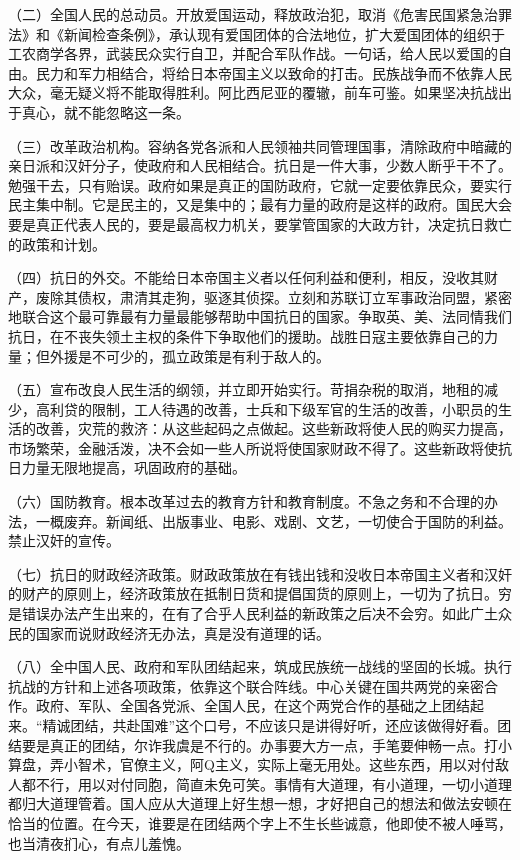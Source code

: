 （二）全国人民的总动员。开放爱国运动，释放政治犯，取消《危害民国紧急治罪法》和《新闻检查条例》，承认现有爱国团体的合法地位，扩大爱国团体的组织于工农商学各界，武装民众实行自卫，并配合军队作战。一句话，给人民以爱国的自由。民力和军力相结合，将给日本帝国主义以致命的打击。民族战争而不依靠人民大众，毫无疑义将不能取得胜利。阿比西尼亚的覆辙，前车可鉴。如果坚决抗战出于真心，就不能忽略这一条。

（三）改革政治机构。容纳各党各派和人民领袖共同管理国事，清除政府中暗藏的亲日派和汉奸分子，使政府和人民相结合。抗日是一件大事，少数人断乎干不了。勉强干去，只有贻误。政府如果是真正的国防政府，它就一定要依靠民众，要实行民主集中制。它是民主的，又是集中的；最有力量的政府是这样的政府。国民大会要是真正代表人民的，要是最高权力机关，要掌管国家的大政方针，决定抗日救亡的政策和计划。

（四）抗日的外交。不能给日本帝国主义者以任何利益和便利，相反，没收其财产，废除其债权，肃清其走狗，驱逐其侦探。立刻和苏联订立军事政治同盟，紧密地联合这个最可靠最有力量最能够帮助中国抗日的国家。争取英、美、法同情我们抗日，在不丧失领土主权的条件下争取他们的援助。战胜日寇主要依靠自己的力量；但外援是不可少的，孤立政策是有利于敌人的。

（五）宣布改良人民生活的纲领，并立即开始实行。苛捐杂税的取消，地租的减少，高利贷的限制，工人待遇的改善，士兵和下级军官的生活的改善，小职员的生活的改善，灾荒的救济：从这些起码之点做起。这些新政将使人民的购买力提高，市场繁荣，金融活泼，决不会如一些人所说将使国家财政不得了。这些新政将使抗日力量无限地提高，巩固政府的基础。

（六）国防教育。根本改革过去的教育方针和教育制度。不急之务和不合理的办法，一概废弃。新闻纸、出版事业、电影、戏剧、文艺，一切使合于国防的利益。禁止汉奸的宣传。

（七）抗日的财政经济政策。财政政策放在有钱出钱和没收日本帝国主义者和汉奸的财产的原则上，经济政策放在抵制日货和提倡国货的原则上，一切为了抗日。穷是错误办法产生出来的，在有了合乎人民利益的新政策之后决不会穷。如此广土众民的国家而说财政经济无办法，真是没有道理的话。

（八）全中国人民、政府和军队团结起来，筑成民族统一战线的坚固的长城。执行抗战的方针和上述各项政策，依靠这个联合阵线。中心关键在国共两党的亲密合作。政府、军队、全国各党派、全国人民，在这个两党合作的基础之上团结起来。“精诚团结，共赴国难”这个口号，不应该只是讲得好听，还应该做得好看。团结要是真正的团结，尔诈我虞是不行的。办事要大方一点，手笔要伸畅一点。打小算盘，弄小智术，官僚主义，阿Q主义，实际上毫无用处。这些东西，用以对付敌人都不行，用以对付同胞，简直未免可笑。事情有大道理，有小道理，一切小道理都归大道理管着。国人应从大道理上好生想一想，才好把自己的想法和做法安顿在恰当的位置。在今天，谁要是在团结两个字上不生长些诚意，他即使不被人唾骂，也当清夜扪心，有点儿羞愧。

